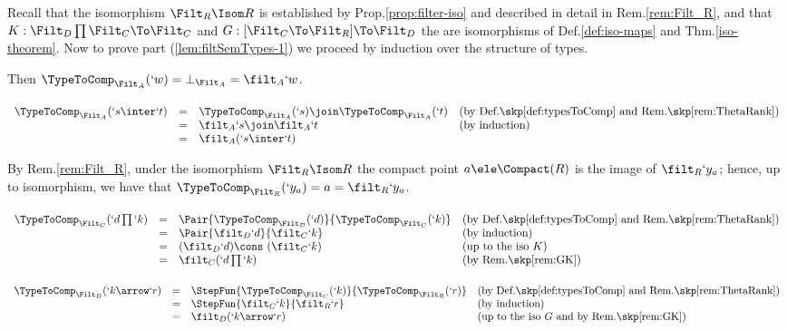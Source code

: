 \documentclass{CSML}
\begin{document}
 \begin{Proof} Recall that the isomorphism $\Filt_R\Isom R$ is established by Prop.\skp\ref{prop:filter-iso} and described in detail in Rem.\skp\ref{rem:Filt_R}, and that $K:\Filt_D\prod\Filt_C \To \Filt_C$ and
$G:[\Filt_C\To\Filt_R]\To \Filt_D$ the are isomorphisms of Def.\skp\ref{def:iso-maps} and Thm.\skp\ref{iso-theorem}. Now
to prove part (\ref{lem:filtSemTypes-1}) we proceed by induction over the structure of types. %
 \begin{description} \itemsep 2pt

 \item [$ `s \equiv `w $] 
Then $\TypeToComp_{\Filt_A}(`w) = \bot_{\Filt_A} = \filt_A`w$.

 \item [$ `s \equiv `s\inter`t $] 
%
 $ \begin{array}[t]{rcl@{\quad}l}
\TypeToComp_{\Filt_A}(`s\inter`t) & = & \TypeToComp_{\Filt_A}(`s) \join \TypeToComp_{\Filt_A}(`t) & 
(\textrm{by Def.\skp\ref{def:typesToComp} and Rem.\skp\ref{rem:ThetaRank}}) \\ %
	& = & \filt_A `s \join \filt_A`t & (\textrm{by induction}) \\ %
	& = & \filt_A(`s\inter`t)
 \end{array} $

 \item [$ `s \equiv `y_a $] 
By Rem.\skp\ref{rem:Filt_R}, under the isomorphism $\Filt_R\Isom R$ the compact point $a\ele \Compact(R)$ is the image of $\filt_R`y_a$; hence, up to isomorphism, we have that $\TypeToComp_{\Filt_R}(`y_a)= a =\filt_R`y_a$.

 \item [$ `s \equiv `d\prod`k $] 
%
 $ \begin{array}[t]{rcl@{\quad}l}
 \TypeToComp_{\Filt_C}(`d\prod`k) & = & \Pair{\TypeToComp_{\Filt_D }(`d)}{\TypeToComp_{\Filt_C}(`k)} & 
	(\textrm{by Def.\skp\ref{def:typesToComp} and Rem.\skp\ref{rem:ThetaRank}}) \\ %
	& = & \Pair{\filt_D`d}{\filt_C`k} & (\textrm{by induction}) \\ %
	& = & (\filt_D`d) \cons \ (\filt_C`k) & (\textrm{up to the iso } K ) \\ %
	& = & \filt_C(`d\prod`k) & (\textrm{by Rem.\skp\ref{rem:GK}}) 
 \end{array} $

 \item [$ `s \equiv `k\arrow `r $] 
%
 $ \begin{array}[t]{rcl@{\quad}l}
 \TypeToComp_{\Filt_D }(`k\arrow `r) & = & \StepFun{\TypeToComp_{\Filt_C}(`k)}{\TypeToComp_{\Filt_R}(`r)} &
	(\textrm{by Def.\skp\ref{def:typesToComp} and Rem.\skp\ref{rem:ThetaRank}}) \\ %
	& = & \StepFun{\filt_C`k}{\filt_R`r} & (\textrm{by induction}) \\ %
	& = & \filt_D(`k\arrow `r) & (\textrm{up to the iso $G$ and by Rem.\skp\ref{rem:GK}})
 \end{array} $
	

\end{description}
\end{Proof}
\end{document}
